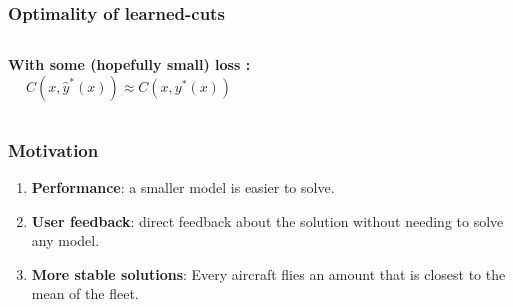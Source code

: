 \begin{frame}
\frametitle{\textbf{Optimality of learned-cuts}}

  \begin{columns}[c]
    \textbf{With some (hopefully small) loss :}
    \begin{equation*}
      C(x,\hat{y}^{*}(x)) \approx  C(x,y^{*}(x))
    \end{equation*}
  \end{columns}
\end{frame}

\begin{frame}
\frametitle{\textbf{Motivation}}

  \begin{enumerate}[<+->]

  \item
    \textbf{Performance}: a smaller model is easier to solve.
  \item
    \textbf{User feedback}: direct feedback about the solution without
    needing to solve any model.
  \item
    \textbf{More stable solutions}: Every aircraft flies an amount that is
    closest to the mean of the fleet.
  \end{enumerate}
\end{frame}

